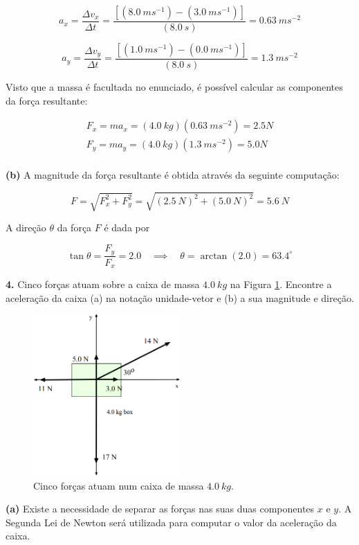 $$
a_x=\frac{\Delta v_x}{\Delta t}=\frac{[(8.0\ ms^{-1})-(3.0\ ms^{-1})]}{(8.0\ s)}=0.63\ ms^{-2}
$$

$$
a_y=\frac{\Delta v_y}{\Delta t}=\frac{[(1.0\ ms^{-1})-(0.0\ ms^{-1})]}{(8.0\ s)}=1.3\ ms^{-2}
$$

Visto que a massa é facultada no enunciado, é possível calcular as componentes da força resultante:

$$
\begin{aligned}
    F_x=ma_x=(4.0\ kg)(0.63\ ms^{-2})=2.5N \\
    F_y=ma_y=(4.0\ kg)(1.3\ ms^{-2})=5.0N \\
\end{aligned}
$$

\textbf{(b)} A magnitude da força resultante é obtida através da seguinte computação:

$$
F=\sqrt{F_x^2+F_y^2}=\sqrt{(2.5\ N)^2+(5.0\ N)^2}=5.6\ N
$$

A direção $\theta$ da força $F$ é dada por

$$
\tan \theta = \frac{F_y}{F_x} = 2.0 \quad \implies \quad \theta = \arctan(2.0)=63.4^{\circ}
$$

\textbf{4.} Cinco forças atuam sobre a caixa de massa $4.0\ kg$ na Figura \ref{fig:4caixa}. Encontre a aceleração da caixa (a) na notação unidade-vetor e (b) a sua magnitude e direção.
\linebreak
\begin{figure}[h!]
    \centering
    \includegraphics[width=0.5\textwidth]{forças/fig/ex4.png}
    \caption{Cinco forças atuam num caixa de massa $4.0\ kg$.}
    \label{fig:4caixa}
\end{figure}


\textbf{(a)} Existe a necessidade de separar as forças nas suas duas componentes $x$ e $y$. A Segunda Lei de Newton será utilizada para computar o valor da aceleração da caixa.

